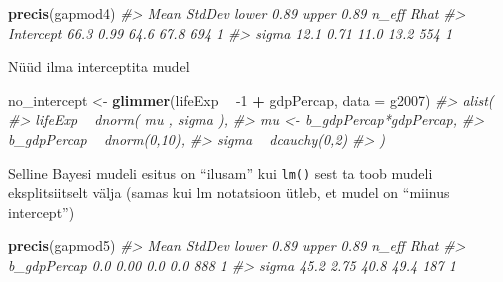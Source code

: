 \documentclass[]{book}
\newenvironment{Shaded}{\begin{snugshade}}{\end{snugshade}}
\newcommand{\CommentTok}[1]{\textcolor[rgb]{0.56,0.35,0.01}{\textit{#1}}}
\newcommand{\DataTypeTok}[1]{\textcolor[rgb]{0.13,0.29,0.53}{#1}}
\newcommand{\DecValTok}[1]{\textcolor[rgb]{0.00,0.00,0.81}{#1}}
\newcommand{\KeywordTok}[1]{\textcolor[rgb]{0.13,0.29,0.53}{\textbf{#1}}}
\newcommand{\NormalTok}[1]{#1}
\newcommand{\OperatorTok}[1]{\textcolor[rgb]{0.81,0.36,0.00}{\textbf{#1}}}
\newcommand{\StringTok}[1]{\textcolor[rgb]{0.31,0.60,0.02}{#1}}
\begin{document}
\begin{Shaded}
\end{Shaded}

\begin{Shaded}
\begin{Highlighting}[]
\KeywordTok{precis}\NormalTok{(gapmod4)}
\CommentTok{#>           Mean StdDev lower 0.89 upper 0.89 n_eff Rhat}
\CommentTok{#> Intercept 66.3   0.99       64.6       67.8   694    1}
\CommentTok{#> sigma     12.1   0.71       11.0       13.2   554    1}
\end{Highlighting}
\end{Shaded}

Nüüd ilma interceptita mudel

\begin{Shaded}
\begin{Highlighting}[]
\NormalTok{no_intercept <-}\StringTok{ }\KeywordTok{glimmer}\NormalTok{(lifeExp }\OperatorTok{~}\StringTok{ }\DecValTok{-1} \OperatorTok{+}\StringTok{ }\NormalTok{gdpPercap, }\DataTypeTok{data =}\NormalTok{ g2007)}
\CommentTok{#> alist(}
\CommentTok{#>     lifeExp ~ dnorm( mu , sigma ),}
\CommentTok{#>     mu <- b_gdpPercap*gdpPercap,}
\CommentTok{#>     b_gdpPercap ~ dnorm(0,10),}
\CommentTok{#>     sigma ~ dcauchy(0,2)}
\CommentTok{#> )}
\end{Highlighting}
\end{Shaded}

Selline Bayesi mudeli esitus on ``ilusam'' kui \texttt{lm()} sest ta toob mudeli eksplitsiitselt välja (samas kui lm notatsioon ütleb, et mudel on ``miinus intercept'')

\begin{Shaded}
\end{Shaded}

\begin{Shaded}
\begin{Highlighting}[]
\KeywordTok{precis}\NormalTok{(gapmod5)}
\CommentTok{#>             Mean StdDev lower 0.89 upper 0.89 n_eff Rhat}
\CommentTok{#> b_gdpPercap  0.0   0.00        0.0        0.0   888    1}
\CommentTok{#> sigma       45.2   2.75       40.8       49.4   187    1}
\end{Highlighting}
\end{Shaded}
\end{document}
